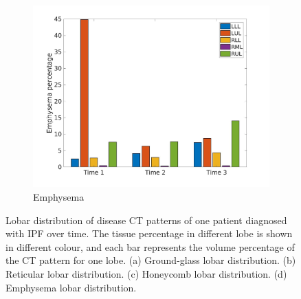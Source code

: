 \begin{figure}[H]
\begin{subfigure}{.46\linewidth}
  \includegraphics[width=\linewidth,trim={{.0\wd0} {.0\wd0} {.0\wd0} {.0\wd0}},clip]{QuantitativeAnalysis/Image/IPF15EmphysemaLobarRegionDiseaseDistributionOverTime.jpg}
  \caption{Emphysema}
  \label{fig:IPF15LobarRegionDiseaseDistributionOverTimeMain-d}
\end{subfigure}
\caption{Lobar distribution of disease CT patterns of one patient diagnosed with IPF over time. The tissue percentage in different lobe is shown in different colour, and each bar represents the volume percentage of the CT pattern for one lobe. (a) Ground-glass lobar distribution. (b) Reticular lobar distribution. (c) Honeycomb lobar distribution. (d) Emphysema lobar distribution.}
\label{fig:IPF15LobarRegionDiseaseDistributionOverTimeMain}
\end{figure}

